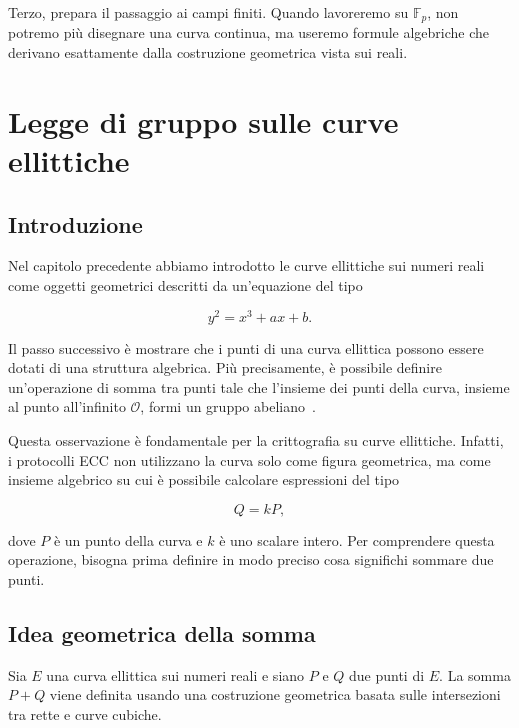 \documentclass[12pt,a4paper,oneside]{report}
\begin{document}
Terzo, prepara il passaggio ai campi finiti. Quando lavoreremo su \(\mathbb{F}_p\), non potremo più disegnare una curva continua, ma useremo formule algebriche che derivano esattamente dalla costruzione geometrica vista sui reali.

\chapter{Legge di gruppo sulle curve ellittiche}

\section{Introduzione}

Nel capitolo precedente abbiamo introdotto le curve ellittiche sui numeri reali come oggetti geometrici descritti da un'equazione del tipo

\begin{equation}
    y^2 = x^3 + ax + b.
\end{equation}

Il passo successivo è mostrare che i punti di una curva ellittica possono essere dotati di una struttura algebrica. Più precisamente, è possibile definire un'operazione di somma tra punti tale che l'insieme dei punti della curva, insieme al punto all'infinito \(\mathcal{O}\), formi un gruppo abeliano~\cite{margara_ec,sec1}.

Questa osservazione è fondamentale per la crittografia su curve ellittiche. Infatti, i protocolli ECC non utilizzano la curva solo come figura geometrica, ma come insieme algebrico su cui è possibile calcolare espressioni del tipo

\[
Q = kP,
\]

dove \(P\) è un punto della curva e \(k\) è uno scalare intero. Per comprendere questa operazione, bisogna prima definire in modo preciso cosa significhi sommare due punti.

\section{Idea geometrica della somma}

Sia \(E\) una curva ellittica sui numeri reali e siano \(P\) e \(Q\) due punti di \(E\). La somma \(P+Q\) viene definita usando una costruzione geometrica basata sulle intersezioni tra rette e curve cubiche.
\end{document}
